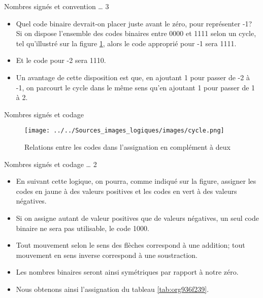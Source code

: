 \documentclass[presentation]{beamer}
\begin{document}
\begin{frame}[label={sec:org83d37a4}]{Nombres signés et convention \ldots{} 3}
\begin{itemize}
\item Quel code binaire devrait-on placer juste avant le zéro, pour représenter -1? Si on dispose l'ensemble des codes binaires entre 0000 et 1111 selon un cycle, tel qu'illustré sur la figure \ref{fig:org3b73a8e}, alors le code approprié pour -1 sera 1111.

\item Et le code pour -2 sera 1110.

\item Un avantage de cette disposition est que, en ajoutant 1 pour passer de -2 à -1, on parcourt le cycle dans le même sens qu'en ajoutant 1 pour passer de 1 à 2.
\end{itemize}
\end{frame}

\begin{frame}[label={sec:org6db1827}]{Nombres signés et codage}
\begin{figure}[htbp]
\centering
\texttt{[image: ../../Sources\_images\_logiques/images/cycle.png]}
\caption{\label{fig:org3b73a8e}Relations entre les codes dans l'assignation en complément à deux}
\end{figure}
\end{frame}

\begin{frame}[label={sec:orgd4dfba8}]{Nombres signés et codage \ldots{} 2}
\begin{itemize}
\item En suivant cette logique, on pourra, comme indiqué sur la figure, assigner les codes en jaune à des valeurs positives et les codes en vert à des valeurs négatives.

\item Si on assigne autant de valeur positives que de valeurs négatives, un seul code binaire ne sera pas utilisable, le code 1000.

\item Tout mouvement selon le sens des flèches correspond à une addition; tout mouvement en sens inverse correspond à une soustraction.

\item Les nombres binaires seront ainsi symétriques par rapport à notre zéro.

\item Nous obtenons ainsi l'assignation du tableau \ref{tab:org936f239}.
\end{itemize}
\end{frame}
\end{document}
